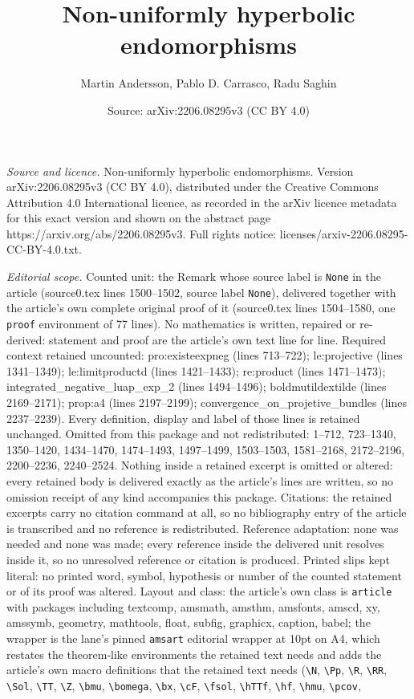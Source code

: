 \documentclass[10pt,a4paper]{amsart}
\title[Non-uniformly hyperbolic endomorphisms]{Non-uniformly hyperbolic endomorphisms}
\author{Martin Andersson, Pablo D. Carrasco, Radu Saghin}
\date{Source: arXiv:2206.08295v3 (CC BY 4.0)}
\begin{document}
\maketitle

\noindent\emph{Source and licence.} Non-uniformly hyperbolic endomorphisms. Version arXiv:2206.08295v3 (CC BY 4.0), distributed under the Creative Commons Attribution 4.0 International licence, as recorded in the arXiv licence metadata for this exact version and shown on the abstract page https://arxiv.org/abs/2206.08295v3. Full rights notice: licenses/arxiv-2206.08295-CC-BY-4.0.txt.\par\smallskip

\noindent\textit{Editorial scope.} Counted unit: the Remark whose source label is \texttt{None} in the article (source0.tex lines 1500--1502, source label \texttt{None}), delivered together with the article's own complete original proof of it (source0.tex lines 1504--1580, one \texttt{proof} environment of 77 lines). No mathematics is written, repaired or re-derived: statement and proof are the article's own text line for line. Required context retained uncounted: pro:existeexpneg (lines 713--722); le:projective (lines 1341--1349); le:limitproductd (lines 1421--1433); re:product (lines 1471--1473); integrated\_negative\_luap\_exp\_2 (lines 1494--1496); boldmutildextilde (lines 2169--2171); prop:a4 (lines 2197--2199); convergence\_on\_projetive\_bundles (lines 2237--2239). Every definition, display and label of those lines is retained unchanged. Omitted from this package and not redistributed: 1--712, 723--1340, 1350--1420, 1434--1470, 1474--1493, 1497--1499, 1503--1503, 1581--2168, 2172--2196, 2200--2236, 2240--2524. Nothing inside a retained excerpt is omitted or altered: every retained body is delivered exactly as the article's lines are written, so no omission receipt of any kind accompanies this package. Citations: the retained excerpts carry no citation command at all, so no bibliography entry of the article is transcribed and no reference is redistributed. Reference adaptation: none was needed and none was made; every reference inside the delivered unit resolves inside it, so no unresolved reference or citation is produced. Printed slips kept literal: no printed word, symbol, hypothesis or number of the counted statement or of its proof was altered. Layout and class: the article's own class is \texttt{article} with packages including textcomp, amsmath, amsthm, amsfonts, amscd, xy, amssymb, geometry, mathtools, float, subfig, graphicx, caption, babel; the wrapper is the lane's pinned \texttt{amsart} editorial wrapper at 10pt on A4, which restates the theorem-like environments the retained text needs and adds the article's own macro definitions that the retained text needs (\texttt{\textbackslash N}, \texttt{\textbackslash Pp}, \texttt{\textbackslash R}, \texttt{\textbackslash RR}, \texttt{\textbackslash Sol}, \texttt{\textbackslash TT}, \texttt{\textbackslash Z}, \texttt{\textbackslash bmu}, \texttt{\textbackslash bomega}, \texttt{\textbackslash bx}, \texttt{\textbackslash cF}, \texttt{\textbackslash fsol}, \texttt{\textbackslash hTTf}, \texttt{\textbackslash hf}, \texttt{\textbackslash hmu}, \texttt{\textbackslash pcov}, 
\end{document}
